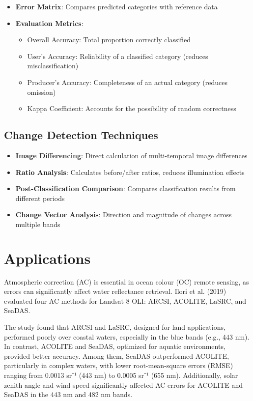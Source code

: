 \documentclass[
  letterpaper,
]{scrbook}
\providecommand{\tightlist}{%
  \setlength{\itemsep}{0pt}\setlength{\parskip}{0pt}}\usepackage{longtable,booktabs,array}
\begin{document}
\begin{itemize}
\tightlist
\item
  \textbf{Error Matrix}: Compares predicted categories with reference
  data
\item
  \textbf{Evaluation Metrics}:

  \begin{itemize}
  \tightlist
  \item
    Overall Accuracy: Total proportion correctly classified
  \item
    User's Accuracy: Reliability of a classified category (reduces
    misclassification)
  \item
    Producer's Accuracy: Completeness of an actual category (reduces
    omission)
  \item
    Kappa Coefficient: Accounts for the possibility of random
    correctness
  \end{itemize}
\end{itemize}

\subsection{Change Detection
Techniques}\label{change-detection-techniques}

\begin{itemize}
\tightlist
\item
  \textbf{Image Differencing}: Direct calculation of multi-temporal
  image differences
\item
  \textbf{Ratio Analysis}: Calculates before/after ratios, reduces
  illumination effects
\item
  \textbf{Post-Classification Comparison}: Compares classification
  results from different periods
\item
  \textbf{Change Vector Analysis}: Direction and magnitude of changes
  across multiple bands
\end{itemize}

\section{Applications}\label{applications-1}

Atmospheric correction (AC) is essential in ocean colour (OC) remote
sensing, as errors can significantly affect water reflectance retrieval.
Ilori et al. (2019) evaluated four AC methods for Landsat 8 OLI: ARCSI,
ACOLITE, LaSRC, and SeaDAS.

The study found that ARCSI and LaSRC, designed for land applications,
performed poorly over coastal waters, especially in the blue bands
(e.g., 443 nm). In contrast, ACOLITE and SeaDAS, optimized for aquatic
environments, provided better accuracy. Among them, SeaDAS outperformed
ACOLITE, particularly in complex waters, with lower root-mean-square
errors (RMSE) ranging from 0.0013 sr⁻¹ (443 nm) to 0.0005 sr⁻¹ (655 nm).
Additionally, solar zenith angle and wind speed significantly affected
AC errors for ACOLITE and SeaDAS in the 443 nm and 482 nm bands.
\end{document}
